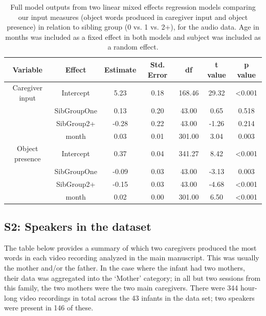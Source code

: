 \documentclass[
  man,mask,floatsintext]{apa6}
\begin{document}
\begin{longtable}[t]{ccccccc}
\caption{\label{tab:table-input-model-summary-audio}Full model outputs from two linear mixed effects regression models comparing our input measures (object words produced in caregiver input and object presence) in relation to sibling group (0 vs. 1 vs. 2+), for the audio data. Age in months was included as a fixed effect in both models and subject was included as a random effect.}\\
\toprule
Variable & Effect & Estimate & Std. Error & df & t value & p value\\
\midrule
Caregiver input & Intercept & 5.23 & 0.18 & 168.46 & 29.32 & <0.001\\
 & SibGroupOne & 0.13 & 0.20 & 43.00 & 0.65 & 0.518\\
 & SibGroup2+ & -0.28 & 0.22 & 43.00 & -1.26 & 0.214\\
 & month & 0.03 & 0.01 & 301.00 & 3.04 & 0.003\\
\midrule
Object presence & Intercept & 0.37 & 0.04 & 341.27 & 8.42 & <0.001\\
\addlinespace
 & SibGroupOne & -0.09 & 0.03 & 43.00 & -3.13 & 0.003\\
 & SibGroup2+ & -0.15 & 0.03 & 43.00 & -4.68 & <0.001\\
 & month & 0.02 & 0.00 & 301.00 & 6.50 & <0.001\\
\bottomrule
\end{longtable}

\newpage

\hypertarget{s2-speakers-in-the-dataset}{%
\subsection{S2: Speakers in the dataset}\label{s2-speakers-in-the-dataset}}

The table below provides a summary of which two caregivers produced the most words in each video recording analyzed in the main manuscript. This was usually the mother and/or the father. In the case where the infant had two mothers, their data was aggregated into the `Mother' category; in all but two sessions from this family, the two mothers were the two main caregivers. There were 344 hour-long video recordings in total across the 43 infants in the data set; two speakers were present in 146 of these.
\end{document}
